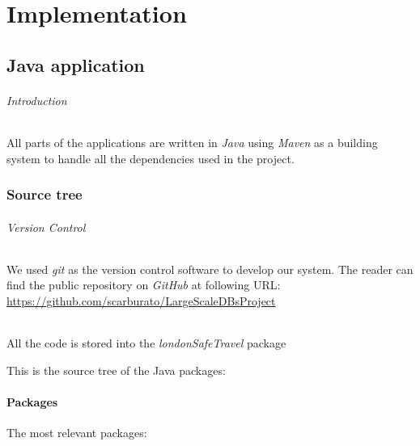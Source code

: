 \part{Implementation}

\chapter{Java application}

\paragraph{Introduction}
All parts of the applications are written in \textit{Java} using \textit{Maven} 
as a building system to handle all the dependencies used in the project.

\section{Source tree}

\paragraph{Version Control}
We used \textit{git} as the version control software to develop our system. The 
reader can find the public repository on \textit{GitHub} at following URL: 
\url{https://github.com/scarburato/LargeScaleDBsProject}

\paragraph{}
All the code is stored into the \textit{londonSafeTravel} package

This is the source tree of the Java packages:



\subsection{Packages}
The most relevant packages:

